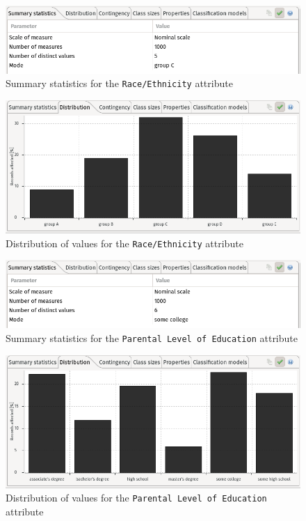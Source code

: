 \documentclass[a4paper, 11pt]{article}
\begin{document}
\begin{figure}[H]
    \centering
    \includegraphics[width=.9\textwidth]{img/race.png}
    \caption{Summary statistics for the \texttt{Race/Ethnicity} attribute}
\end{figure}

\vspace{1.5\baselineskip}

\begin{figure}[H]
    \centering
    \includegraphics[width=.9\textwidth]{img/race-distr.png}
    \caption{Distribution of values for the \texttt{Race/Ethnicity} attribute}
\end{figure}

\vspace{1.5\baselineskip}

\begin{figure}[H]
    \centering
    \includegraphics[width=.9\textwidth]{img/education.png}
    \caption{Summary statistics for the \texttt{Parental Level of Education} 
attribute}
\end{figure}

\begin{figure}[H]
    \centering
    \includegraphics[width=.9\textwidth]{img/education-distr.png}
    \caption{Distribution of values for the \texttt{Parental Level of 
Education} attribute}
\end{figure}
\end{document}

